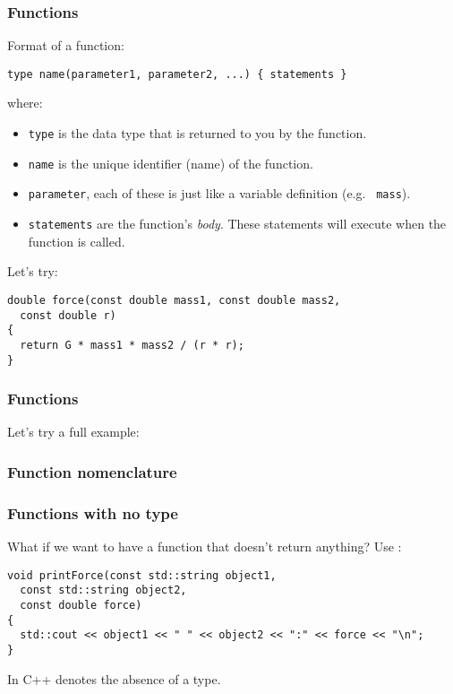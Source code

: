 \documentclass{beamer}
\begin{document}
\begin{frame}[fragile]
  \frametitle{Functions}

  Format of a function:
  \begin{lstlisting}
type name(parameter1, parameter2, ...) { statements }  
  \end{lstlisting}
  where:
  \begin{itemize}
    \item<2->{\texttt{type} is the data type that is returned to you by the function.}
    \item<3->{\texttt{name} is the unique identifier (name) of the function.}
    \item<4->{\texttt{parameter}, each of these is just like a variable definition (e.g. \texttt{ mass}).}
    \item<5->{\texttt{statements} are the function's \textit{body}.  These statements will execute when the function is called.}
  \end{itemize}
  \pause[6]
  Let's try:
  \begin{lstlisting}
double force(const double mass1, const double mass2,
  const double r)
{
  return G * mass1 * mass2 / (r * r);
}
  \end{lstlisting}
\end{frame}


\begin{frame}[fragile]
  \frametitle{Functions}

  Let's try a full example:
  
\end{frame}

\begin{frame}
  \frametitle{Function nomenclature}
  
  
\end{frame}

\begin{frame}[fragile]
  \frametitle{Functions with no type}
  
  What if we want to have a function that doesn't return anything?\newline
  \pause
  Use :
  \begin{lstlisting}
void printForce(const std::string object1,
  const std::string object2,
  const double force)
{
  std::cout << object1 << " " << object2 << ":" << force << "\n";
}
  \end{lstlisting}
  In C++  denotes the absence of a type.
\end{frame}
\end{document}

